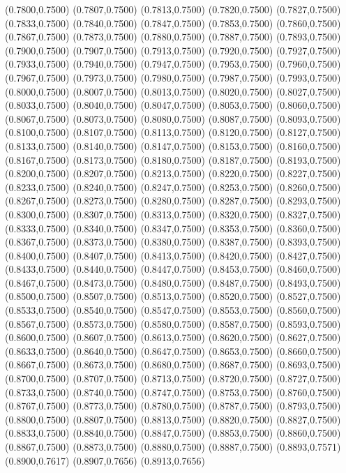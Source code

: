 {(0.7800,0.7500) (0.7807,0.7500) (0.7813,0.7500) (0.7820,0.7500) (0.7827,0.7500) (0.7833,0.7500)
(0.7840,0.7500) (0.7847,0.7500) (0.7853,0.7500) (0.7860,0.7500) (0.7867,0.7500) (0.7873,0.7500)
(0.7880,0.7500) (0.7887,0.7500) (0.7893,0.7500) (0.7900,0.7500) (0.7907,0.7500) (0.7913,0.7500)
(0.7920,0.7500) (0.7927,0.7500) (0.7933,0.7500) (0.7940,0.7500) (0.7947,0.7500) (0.7953,0.7500)
(0.7960,0.7500) (0.7967,0.7500) (0.7973,0.7500) (0.7980,0.7500) (0.7987,0.7500) (0.7993,0.7500)
(0.8000,0.7500) (0.8007,0.7500) (0.8013,0.7500) (0.8020,0.7500) (0.8027,0.7500) (0.8033,0.7500)
(0.8040,0.7500) (0.8047,0.7500) (0.8053,0.7500) (0.8060,0.7500) (0.8067,0.7500) (0.8073,0.7500)
(0.8080,0.7500) (0.8087,0.7500) (0.8093,0.7500) (0.8100,0.7500) (0.8107,0.7500) (0.8113,0.7500)
(0.8120,0.7500) (0.8127,0.7500) (0.8133,0.7500) (0.8140,0.7500) (0.8147,0.7500) (0.8153,0.7500)
(0.8160,0.7500) (0.8167,0.7500) (0.8173,0.7500) (0.8180,0.7500) (0.8187,0.7500) (0.8193,0.7500)
(0.8200,0.7500) (0.8207,0.7500) (0.8213,0.7500) (0.8220,0.7500) (0.8227,0.7500) (0.8233,0.7500)
(0.8240,0.7500) (0.8247,0.7500) (0.8253,0.7500) (0.8260,0.7500) (0.8267,0.7500) (0.8273,0.7500)
(0.8280,0.7500) (0.8287,0.7500) (0.8293,0.7500) (0.8300,0.7500) (0.8307,0.7500) (0.8313,0.7500)
(0.8320,0.7500) (0.8327,0.7500) (0.8333,0.7500) (0.8340,0.7500) (0.8347,0.7500) (0.8353,0.7500)
(0.8360,0.7500) (0.8367,0.7500) (0.8373,0.7500) (0.8380,0.7500) (0.8387,0.7500) (0.8393,0.7500)
(0.8400,0.7500) (0.8407,0.7500) (0.8413,0.7500) (0.8420,0.7500) (0.8427,0.7500) (0.8433,0.7500)
(0.8440,0.7500) (0.8447,0.7500) (0.8453,0.7500) (0.8460,0.7500) (0.8467,0.7500) (0.8473,0.7500)
(0.8480,0.7500) (0.8487,0.7500) (0.8493,0.7500) (0.8500,0.7500) (0.8507,0.7500) (0.8513,0.7500)
(0.8520,0.7500) (0.8527,0.7500) (0.8533,0.7500) (0.8540,0.7500) (0.8547,0.7500) (0.8553,0.7500)
(0.8560,0.7500) (0.8567,0.7500) (0.8573,0.7500) (0.8580,0.7500) (0.8587,0.7500) (0.8593,0.7500)
(0.8600,0.7500) (0.8607,0.7500) (0.8613,0.7500) (0.8620,0.7500) (0.8627,0.7500) (0.8633,0.7500)
(0.8640,0.7500) (0.8647,0.7500) (0.8653,0.7500) (0.8660,0.7500) (0.8667,0.7500) (0.8673,0.7500)
(0.8680,0.7500) (0.8687,0.7500) (0.8693,0.7500) (0.8700,0.7500) (0.8707,0.7500) (0.8713,0.7500)
(0.8720,0.7500) (0.8727,0.7500) (0.8733,0.7500) (0.8740,0.7500) (0.8747,0.7500) (0.8753,0.7500)
(0.8760,0.7500) (0.8767,0.7500) (0.8773,0.7500) (0.8780,0.7500) (0.8787,0.7500) (0.8793,0.7500)
(0.8800,0.7500) (0.8807,0.7500) (0.8813,0.7500) (0.8820,0.7500) (0.8827,0.7500) (0.8833,0.7500)
(0.8840,0.7500) (0.8847,0.7500) (0.8853,0.7500) (0.8860,0.7500) (0.8867,0.7500) (0.8873,0.7500)
(0.8880,0.7500) (0.8887,0.7500) (0.8893,0.7571) (0.8900,0.7617) (0.8907,0.7656) (0.8913,0.7656)
}
